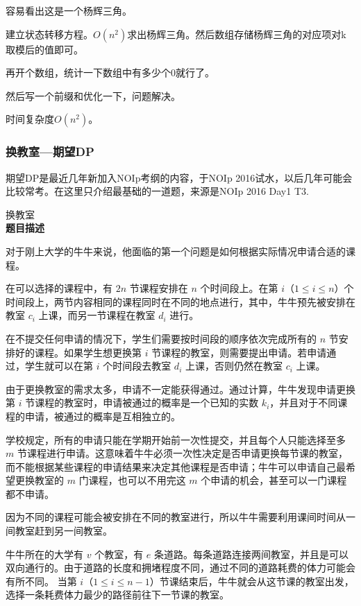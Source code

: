 	容易看出这是一个杨辉三角。

	建立状态转移方程。$O(n^2)$求出杨辉三角。然后数组存储杨辉三角的对应项对k取模后的值即可。

	再开个数组，统计一下数组中有多少个0就行了。

	然后写一个前缀和优化一下，问题解决。

	时间复杂度$O(n^2)$。

	\note

	\subsubsection{换教室---期望DP}
	期望DP是最近几年新加入NOIp考纲的内容，于NOIp 2016试水，以后几年可能会比较常考。在这里只介绍最基础的一道题，来源是NOIp 2016 Day1 T3.

	\begin{example} 换教室\\
		\textbf{题目描述}

		对于刚上大学的牛牛来说，他面临的第一个问题是如何根据实际情况申请合适的课程。

		在可以选择的课程中，有 $2n$ 节课程安排在 $n$ 个时间段上。在第 $i$（$1 \leq i \leq n$）个时间段上，两节内容相同的课程同时在不同的地点进行，其中，牛牛预先被安排在教室 $c_i$ 上课，而另一节课程在教室 $d_i$ 进行。

		在不提交任何申请的情况下，学生们需要按时间段的顺序依次完成所有的 $n$ 节安排好的课程。如果学生想更换第 $i$ 节课程的教室，则需要提出申请。若申请通过，学生就可以在第 $i$ 个时间段去教室 $d_i$ 上课，否则仍然在教室 $c_i$ 上课。

		由于更换教室的需求太多，申请不一定能获得通过。通过计算，牛牛发现申请更换第 $i$ 节课程的教室时，申请被通过的概率是一个已知的实数 $k_i$，并且对于不同课程的申请，被通过的概率是互相独立的。

		学校规定，所有的申请只能在学期开始前一次性提交，并且每个人只能选择至多 $m$ 节课程进行申请。这意味着牛牛必须一次性决定是否申请更换每节课的教室，而不能根据某些课程的申请结果来决定其他课程是否申请；牛牛可以申请自己最希望更换教室的 $m$ 门课程，也可以不用完这 $m$ 个申请的机会，甚至可以一门课程都不申请。

		因为不同的课程可能会被安排在不同的教室进行，所以牛牛需要利用课间时间从一间教室赶到另一间教室。

		牛牛所在的大学有 $v$ 个教室，有 $e$ 条道路。每条道路连接两间教室，并且是可以双向通行的。由于道路的长度和拥堵程度不同，通过不同的道路耗费的体力可能会有所不同。 当第 $i$（$1 \leq i \leq n-1$）节课结束后，牛牛就会从这节课的教室出发，选择一条耗费体力最少的路径前往下一节课的教室。


\end{example}
